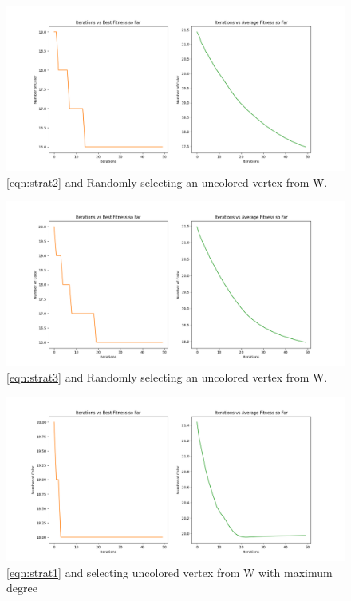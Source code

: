 \documentclass[a4paper]{article}
\begin{document}
\newpage
\begin{center}
\begin{figure}[h]
\centering
\includegraphics[width=12cm]{Figures/fig2.png}
\caption{\ref{eqn:strat2} and Randomly selecting an uncolored vertex from W.}
\label{fig:figure2}
\end{figure}
\end{center}

    
\begin{center}
\begin{figure}[h]
\centering
\includegraphics[width=12cm]{Figures/fig3.png}
\caption{\ref{eqn:strat3} and Randomly selecting an uncolored vertex from W.}
\end{figure}
\end{center}

    
\newpage
\begin{center}
\begin{figure}[h]
\centering
\includegraphics[width=12cm]{Figures/fig4.png}
\caption{\ref{eqn:strat1} and selecting uncolored vertex from W with maximum degree}
\end{figure}
\end{center}
\end{document}
